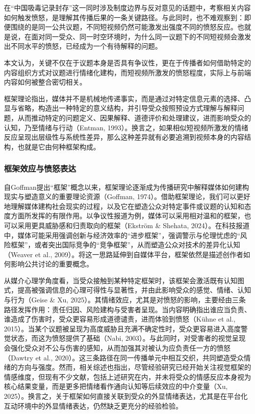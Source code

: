 \documentclass[
]{article}
\begin{document}
在``中国吸毒记录封存''这一同时涉及制度边界与反对意见的话题中，考察相关内容如何触发愤怒，是理解其传播后果的一条关键路径。与此同时，也不难观察到：即便围绕的是同一公共议题，不同短视频仍然可能激发出强度不同的愤怒反应。也就是说，在面对同一受众、同一时空环境时，为什么同一议题下的不同短视频会激发出不同水平的愤怒，已经成为一个有待解释的问题。

本文认为，关键不仅在于议题本身是否具有争议性，更在于传播者如何借助特定的内容组织方式对议题进行情绪化建构，而短视频所激发的愤怒程度，实际上与前端内容如何被整合密切相关。

框架理论指出，媒体并不是机械地传递事实，而是通过对特定信息元素的选择、凸显与省略，构造出一种特定的意义结构，并引导受众按照预设方式理解与解释问题，从而推动特定的问题定义、因果解释、道德评价和处理建议，进而影响受众的认知，乃至情绪与行动（Entman,
1993）。换言之，如果相似短视频所激发的情绪反应呈现出层级性与系统性差异，那么这种差异就有必要追溯到视频本身的内容结构，也就是它由何种框架构成。

\subsubsection{框架效应与愤怒表达}\label{ux6846ux67b6ux6548ux5e94ux4e0eux6124ux6012ux8868ux8fbe}

自Goffman提出``框架''概念以来，框架理论逐渐成为传播研究中解释媒体如何建构现实与塑造意义的重要理论资源（Goffman,
1974）。借助框架理论，我们可以更好地理解媒体建构社会现实的过程，以及它在塑造公众对特定事件或议题的认知和态度方面所发挥的有限作用。以争议性报道为例，媒体可以采用相对温和的框架，也可以采用更具威胁感和归责取向的框架（Ekström
\& Shehata,
2024）。在科技报道中，媒体可能采用强调创新与经济效率的``进步框架''，强调警示与伦理忧虑的``风险框架''，或者突出国际竞争的``竞争框架''，从而塑造公众对技术的差异化认知（Weaver
et al.,
2009）。将这一思路延伸到自媒体平台，框架依然是描述创作者如何影响公共讨论的重要概念。

从媒介心理学角度看，当受众接触到某种特定框架时，该框架会激活既有认知图式，提高被强调信息的心理可得性与显著性，并由此影响受众的感觉、情绪、认知与行为（Geise
\& Xu,
2025）。其情绪效应，尤其是对愤怒的影响，主要经由三条路径发挥作用：责任归因、风险建构与受害者呈现。当内容明确指出谁应当负责、谁造成了伤害时，受众更容易形成道德谴责，进而体验到愤怒（Kühne
et al.,
2015）。当某个议题被呈现为高度威胁且充满不确定性时，受众更容易进入高度警觉状态，而这为愤怒提供了基础（Nabi,
2003）。与此同时，对受害者的视觉呈现会强化受众对不公与伤害的感知，从而加强其对被认为应负责任一方的愤怒（Dawtry
et al.,
2020）。这三条路径在同一传播单元中相互交织，共同塑造受众情绪的方向与强度。然而，相关综述也指出，尽管经验研究已经开始关注视觉框架的情感维度，但现有不少文献，包括上述研究在内，并未将受众的情感反应本身视为核心结果变量，而是更多把情绪看作通向认知等后续效应的中介变量（Xu,
2025）。换言之，关于框架如何直接关联到受众的外显情绪表达，尤其是在平台化互动环境中的外显情绪表达，仍然缺乏更充分的经验检验。
\end{document}
